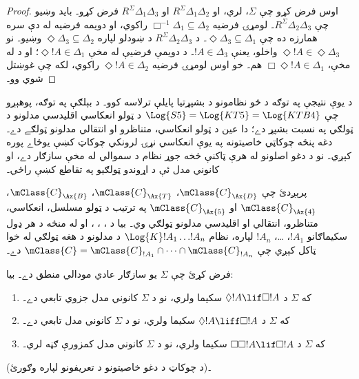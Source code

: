 \documentclass[../../../include/open-logic-section]{subfiles}
\begin{document}
\begin{proof}
  اوس فرض کړو چې $\Sigma$،  لري، او $R^\Sigma
  \Delta_1\Delta_2$ او $R^\Sigma \Delta_1\Delta_3$ فرض کړو۔ بايد وښيو
  چې $R^\Sigma \Delta_2\Delta_3$۔ لومړۍ فرضيه
  $\Box^{-1}\Delta_1 \subseteq \Delta_2$ راکوي، او دويمه فرضيه
  له دې سره همارزه ده چې $\Diamond\Delta_3 \subseteq \Delta_1$۔ د $R^\Sigma
  \Delta_2\Delta_3$ د ښودلو لپاره
  $\Diamond\Delta_3 \subseteq \Delta_2$ وښيو۔ نو $\Diamond!A \in
  \Diamond\Delta_3$ واخلو، يعنې $!A \in \Delta_3$۔ د دويمې فرضيې له مخې
  $\Diamond!A \in \Delta_1$؛ او د  له مخې، $\Box\Diamond!A \in
  \Delta_1$ هم۔ خو اوس لومړۍ فرضيه $\Diamond!A \in
  \Delta_2$ راکوي، لکه چې غوښتل شوي وو۔
  \end{proof}

د يوې نتيجې په توګه د څو نظامونو د بشپړتيا پايلې ترلاسه کوو۔
د بېلګې په توګه، پوهېږو چې $\Log{S5} = \Log{KT5} =
\Log{KTB4}$ د ټولو انعکاسي اقليدسي مدلونو د ټولګي په نسبت بشپړ دے؛
دا عين د ټولو انعکاسي، متناظرو او انتقالي مدلونو ټولګے دے۔
دغه پنځه چوکاټي خاصيتونه په يوې انعکاسي نړۍ لرونکي چوکاټ
کښې يوځاے پوره کېږي۔ نو د دغو اصلونو له هرې ټاکنې څخه جوړ
نظام د سموالي له مخې سازګار دے، او کانوني مدل ئې د اړوندو
ټولګيو په تقاطع کښې راځي۔

\begin{thm}
  پرېږدئ چې $\mClass{C}_\Ax{D}$، $\mClass{C}_\Ax{T}$،
  $\mClass{C}_\Ax{B}$، $\mClass{C}_\Ax{4}$ او
  $\mClass{C}_\Ax{5}$ په ترتيب د ټولو مسلسل، انعکاسي،
  متناظرو، انتقالي او اقليدسي مدلونو ټولګي وي۔ بيا د
  ، ، ،  او  له منځه د هر ډول
  سکيماګانو $!A_1$، \dots، $!A_n$ لپاره، نظام
  $\Log{K}!A_1 \dots !A_n$ د مدلونو د هغه ټولګي له خوا ټاکل کېږي چې
  $\mClass{C} = \mClass{C}_{!A_1} \cap \dots
  \cap \mClass{C}_{!A_n}$ دے۔
\end{thm}

\begin{prop}
  فرض کړئ چې $\Sigma$ يو سازګار عادي مودالي منطق دے۔ بيا:
  \begin{enumerate}
  \item{}%
    که $\Sigma$ د $\Diamond!A \lif \Box
    !A$ سکيما ولري، نو د $\Sigma$ کانوني مدل جزوي تابعي دے۔
  \item که $\Sigma$ د $\Diamond!A \liff \Box
    !A$ سکيما ولري، نو د $\Sigma$ کانوني مدل تابعي دے۔
  \item که $\Sigma$ د $\Box\Box!A \lif \Box
    !A$ سکيما ولري، نو د $\Sigma$ کانوني مدل کمزورې ګڼه لري۔
  \end{enumerate}
(د چوکاټ د دغو خاصيتونو د تعريفونو لپاره 
  وګورئ)۔
\end{prop}
\end{document}
